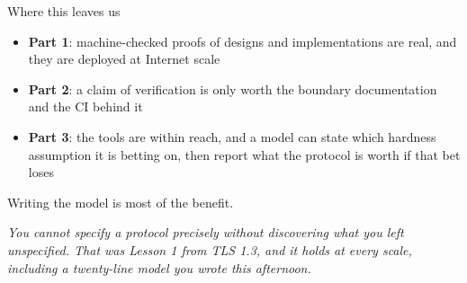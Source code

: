 \ifdefined\PRESENTATION\else\PassOptionsToClass{handout}{beamer}\fi\documentclass[aspectratio=169, lualatex]{beamer}
\begin{document}
\begin{frame}{Where this leaves us}
	\begin{itemize}
		\item \textbf{Part 1}: machine-checked proofs of designs and implementations are real, and they are deployed at Internet scale
		\item \textbf{Part 2}: a claim of verification is only worth the boundary documentation and the CI behind it
		\item \textbf{Part 3}: the tools are within reach, and a model can state which hardness assumption it is betting on, then report what the protocol is worth if that bet loses
	\end{itemize}
	\vspace{0.7em}
	\begin{center}
		\Large
		Writing the model is most of the benefit.

		\vspace{0.3em}

		\normalsize
		\textit{You cannot specify a protocol precisely without discovering what you left unspecified. That was Lesson 1 from TLS 1.3, and it holds at every scale, including a twenty-line model you wrote this afternoon.}
	\end{center}
\end{frame}

\begin{frame}[plain]
	\titlepage
\end{frame}
\end{document}
